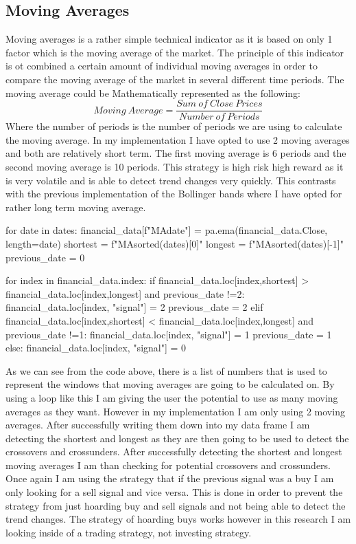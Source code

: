 \documentclass{imc-inf}
\begin{document}
	\subsection{Moving Averages}
	Moving averages is a rather simple technical indicator as it is based on only 1 factor which is the moving average of the market. 
	The principle of this indicator is ot combined a certain amount of individual moving averages in order to compare the moving average of the market in several 
	different time periods. The moving average could be Mathematically represented as the following:
	\begin{equation}
		Moving\ Average = \frac{Sum\ of\ Close\ Prices}{Number\ of\ Periods}
	\end{equation}
	Where the number of periods is the number of periods we are using to calculate the moving average.
	In my implementation I have opted to use 2 moving averages and both are relatively short term. The first moving average is 6 periods and the second moving average is 10 periods.
	This strategy is high risk high reward as it is very volatile and is able to detect trend changes very quickly. This contrasts with the previous implementation of the 
	Bollinger bands where I have opted for rather long term moving average.
	\begin{code}[language=Python,caption={Implementation of Moving Averages}]
		for date in dates:
			financial_data[f"MA{date}"] = pa.ema(financial_data.Close, length=date)
			shortest = f"MA{sorted(dates)[0]}"
			longest = f"MA{sorted(dates)[-1]}"
			previous_date = 0
			
			for index in financial_data.index:
				if financial_data.loc[index,shortest] > financial_data.loc[index,longest] and previous_date !=2:
					financial_data.loc[index, "signal"] = 2
					previous_date = 2
				elif financial_data.loc[index,shortest] < financial_data.loc[index,longest] and previous_date !=1:
					financial_data.loc[index, "signal"] = 1
					previous_date = 1
				else:
					financial_data.loc[index, "signal"] = 0
	\end{code}
	
	As we can see from the code above, there is a list of numbers that is used to represent the windows that moving averages are going to be calculated on. 
	By using a loop like this I am giving the user the potential to use as many moving averages as they want. However in my implementation I am only using 2 moving averages.
	After successfully writing them down into my data frame I am detecting the shortest and longest as they are then going to be used to detect the crossovers and crossunders.
	After successfully detecting the shortest and longest moving averages I am than checking for potential crossovers and crossunders. Once again
	I am using the strategy that if the previous signal was a buy I am only looking for a sell signal and vice versa. This is done in order to prevent the strategy from just hoarding 
	buy and sell signals and not being able to detect the trend changes. The strategy of hoarding buys works however in this research I am looking inside of
	a trading strategy, not investing strategy.
\end{document}
